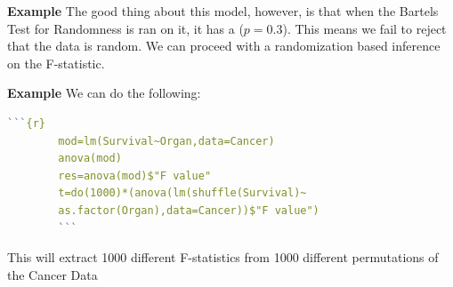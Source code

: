 \documentclass{beamer}
\begin{document}
\begin{frame}{\textbf{Example}}
    The good thing about this model, however, is that when the Bartels Test for Randomness is ran on it, it has a ($p = 0.3$). This means we fail to reject that the data is random. We can proceed with a randomization based inference on the F-statistic.
    
\end{frame}

\begin{frame}[fragile]{\textbf{Example}}
We can do the following:
\newline\quad
    \begin{lstlisting}[language = R]
        ```{r}
        mod=lm(Survival~Organ,data=Cancer)
        anova(mod)
        res=anova(mod)$"F value"
        t=do(1000)*(anova(lm(shuffle(Survival)~
        as.factor(Organ),data=Cancer))$"F value")
        ```
    \end{lstlisting}
    \newline\quad
This will extract 1000 different F-statistics from 1000 different permutations of the Cancer Data

\end{frame}
\end{document}

